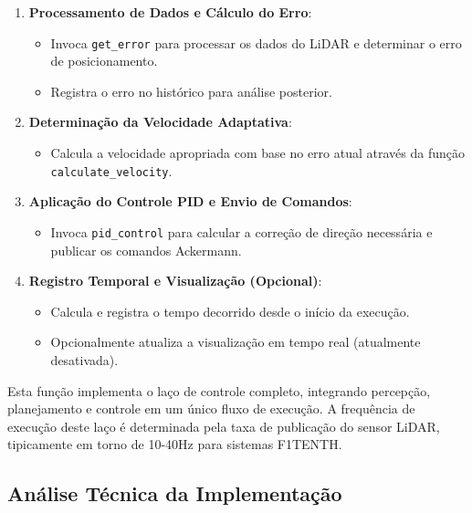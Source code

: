 \begin{enumerate}
    \item \textbf{Processamento de Dados e Cálculo do Erro}:
          \begin{itemize}
              \item Invoca \texttt{get\_error} para processar os dados do LiDAR e determinar o erro
                    de posicionamento.
              \item Registra o erro no histórico para análise posterior.
          \end{itemize}

    \item \textbf{Determinação da Velocidade Adaptativa}:
          \begin{itemize}
              \item Calcula a velocidade apropriada com base no erro atual através da função
                    \texttt{calculate\_velocity}.
          \end{itemize}

    \item \textbf{Aplicação do Controle PID e Envio de Comandos}:
          \begin{itemize}
              \item Invoca \texttt{pid\_control} para calcular a correção de direção necessária e
                    publicar os comandos Ackermann.
          \end{itemize}

    \item \textbf{Registro Temporal e Visualização (Opcional)}:
          \begin{itemize}
              \item Calcula e registra o tempo decorrido desde o início da execução.
              \item Opcionalmente atualiza a visualização em tempo real (atualmente desativada).
          \end{itemize}
\end{enumerate}

Esta função implementa o laço de controle completo, integrando percepção,
planejamento e controle em um único fluxo de execução. A frequência de execução
deste laço é determinada pela taxa de publicação do sensor LiDAR, tipicamente
em torno de 10-40Hz para sistemas F1TENTH.

\subsection{Análise Técnica da Implementação}

